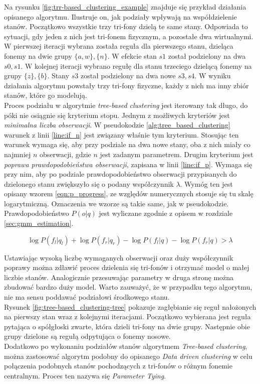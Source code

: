 \documentclass[11pt]{article}
\begin{document}
	Na rysunku \ref{fig:trr-based_clustering_example} znajduje się przykład działania opisanego algorytmu. Ilustruje on, jak podziały wpływają na współdzielenie stanów. Początkowo wszystkie trzy tri-fony dzielą te same stany. Odpowiada to sytuacji, gdy jeden z nich jest tri-fonem fizycznym, a pozostałe dwa wirtualnymi. W pierwszej iteracji wybrana została reguła dla pierwszego stanu, dzieląca fonemy na dwie grupy $\{a,w\},\{n\}$. W efekcie stan $s1$ został podzielony na dwa $s0,s1$. W kolejnej iteracji wybrano regułę dla stanu trzeciego dzielącą fonemy na grupy $\{z\},\{b\}$. Stany $s3$ został podzielony na dwa nowe $s3,s4$. W wyniku działania algorytmu powstały trzy tri-fony fizyczne, każdy z nich ma inny zbiór stanów, które go modelują. \\
	Proces podziału w algorytmie \textit{tree-based clustering} jest iterowany tak długo, do póki nie osiągnie się kryterium stopu. Jednym z możliwych kryteriów jest \textit{minimalna liczba obserwacji}. W pseudokodzie \ref{alg:tree_based_clustering} warunek z linii \ref{line:if_n} jest związany właśnie tym kryterium. Stosując ten warunek wymaga się, aby przy podziale na dwa nowe stany, oba z nich miały co najmniej $n$ obserwacji, gdzie $n$ jest zadanym parametrem. Drugim kryterium jest \textit{poprawa prawdopodobieństwa obserwacji}, zapisana w linii \ref{line:if_p}. Wymaga się przy nim, aby po podziale prawdopodobieństwo obserwacji przypisanych do dzielonego stanu zwiększyło się o podany współczynnik $\lambda$. Wymóg ten jest opisany wzorem \ref{eqn:p_progress}, ze względów numerycznych stosuje się tu skalę logarytmiczną. Oznaczenia we wzorze są takie same, jak w pseudokodzie. Prawdopodobieństwo $P(o|q)$ jest wyliczane zgodnie z opisem w rozdziale \ref{sec:gmm_estimation}.
	 
	 \begin{equation}
	 	\log{P(f_l | q_l)} + \log{P(f_r | q_r)} - \log{P(f_l | q)} - \log{P(f_r | q)} > \lambda
	 	\label{eqn:p_progress}
	 \end{equation}
	 
	Ustawiając wysoką liczbę wymaganych obserwacji oraz duży współczynnik poprawy można zdławić proces dzielenia się tri-fonów i otrzymać model o małej liczbie stanów. Analogicznie przesuwając parametry w druga stronę można zbudować bardzo duży model. Warto zauważyć, że w przypadku tego algorytmu, nie ma sensu poddawać podziałowi środkowego stanu.  \\
	Rysunek \ref{fig:tree-based_clustering-tree} pokazuje zagłębianie się reguł nałożonych na pierwszy stan wraz z kolejnymi iteracjami. Początkowo wybierana jest reguła pytająca o spółgłoski zwarte, która dzieli tri-fony na dwie grupy. Następnie obie grupy dzielone są regułą odpytująca o fonemy nosowe. \\
	Dodatkowo po wykonaniu podziałów stanów algorytmem \textit{Tree-based clustering}, można zastosować algorytm podobny do opisanego \textit{Data driven clustering} w celu połączenia podobnych stanów pochodzących z tri-fonów o różnym fonemie centralnym. Proces ten nazywa się \textit{Parameter Tying}.
	
\end{document}
